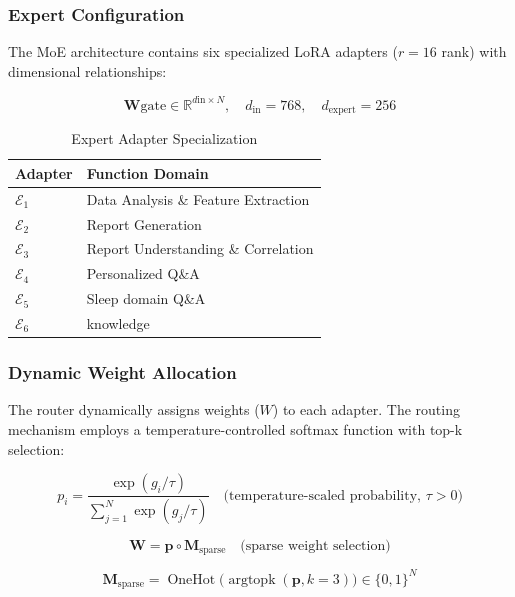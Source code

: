 \documentclass[preprint,12pt]{elsarticle}
\begin{document}
\subsubsection{Expert Configuration}

The MoE architecture contains six specialized LoRA adapters ($
r=16$ rank) with dimensional relationships:

\begin{equation}
\mathbf{W}{\text{gate}} \in \mathbb{R}^{d{\text{in}} \times N}, \quad d_{\text{in}}=768, \quad d_{\text{expert}}=256
\end{equation}

\begin{table}[h]
\centering
\caption{Expert Adapter Specialization}
\begin{tabular}{ll}
\hline
Adapter & Function Domain \\ \hline
$\mathcal{E}_1$ & Data Analysis \& Feature Extraction \\
$\mathcal{E}_2$ & Report Generation \\
$\mathcal{E}_3$ & Report Understanding \& Correlation \\
$\mathcal{E}_4$ & Personalized Q\&A \\
$\mathcal{E}_5$ & Sleep domain Q\&A \\
$\mathcal{E}_6$ & knowledge \\ \hline
\end{tabular}
\end{table}

\subsubsection{Dynamic Weight Allocation}
The router dynamically assigns weights ($W$) to each adapter. The routing mechanism employs a temperature-controlled softmax function with top-k selection:

\begin{equation}
    p_i = \frac{\exp(g_i/\tau)}{\sum_{j=1}^N \exp(g_j/\tau)} \quad 
    \text{(temperature-scaled probability, } \tau > 0\text{)}
    \label{eq:prob}
\end{equation}

\begin{equation}
    \mathbf{W} = \mathbf{p} \circ \mathbf{M}_{\text{sparse}} \quad
    \text{(sparse weight selection)}
    \label{eq:sparse_weight}
\end{equation}

\begin{equation}
    \mathbf{M}_{\text{sparse}} = \mathop{\text{OneHot}}\big(\mathop{\text{argtopk}}(\mathbf{p}, k=3)\big) \in \{0,1\}^N
    \label{eq:mask_def}
\end{equation}
\end{document}
